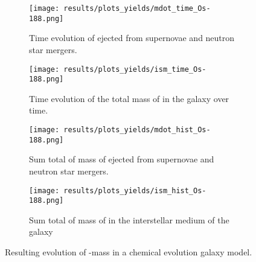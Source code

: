 \begin{figure}
  \begin{subfigure}{\subfigwidth}
    \centering
    \texttt{[image: results/plots\_yields/mdot\_time\_Os-188.png]}
    \caption{Time evolution of  ejected from supernovae and neutron star mergers.}
  \end{subfigure}
  \begin{subfigure}{\subfigwidth}
    \centering
    \texttt{[image: results/plots\_yields/ism\_time\_Os-188.png]}
    \caption{Time evolution of the total mass of  in the galaxy over time.}
  \end{subfigure}
  \begin{subfigure}{\subfigwidth}
    \centering
    \texttt{[image: results/plots\_yields/mdot\_hist\_Os-188.png]}
    \caption{Sum total of mass of  ejected from supernovae and neutron star mergers.}
  \end{subfigure}
  \begin{subfigure}{\subfigwidth}
    \centering
    \texttt{[image: results/plots\_yields/ism\_hist\_Os-188.png]}
    \caption{Sum total of mass of  in the interstellar medium of the galaxy}
  \end{subfigure}
  \caption{Resulting evolution of -mass in a chemical evolution galaxy model.}
\end{figure}
\begin{table}
  
\end{table}

